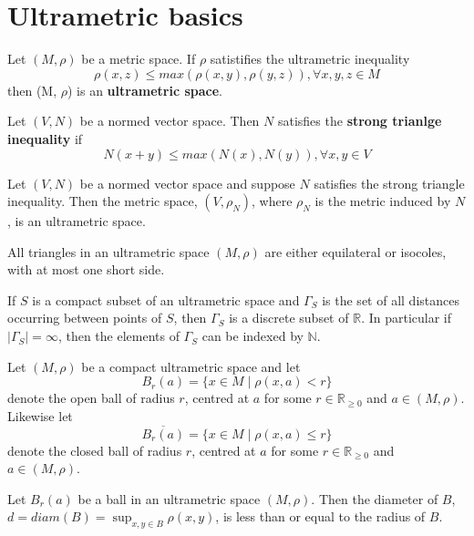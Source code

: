 \section{Ultrametric basics}


\begin{definition*}
	 Let $(M, \rho)$ be a metric space. If $\rho$ satistifies the ultrametric inequality
	\[\rho(x,z) \leq max{(\rho(x,y), \rho(y,z))}, \forall x,y,z \in M\] 
	then (M, $\rho$) is an \textbf{ultrametric space}.
\end{definition*}

\begin{definition*}
	 Let $(V, N)$ be a normed vector space. Then $N$ satisfies the \textbf{strong trianlge inequality} if
	\[N(x + y) \leq max(N(x), N(y)), \forall x,y \in V \]
\end{definition*}

\begin{proposition*}
	Let $(V,N)$ be a normed vector space and suppose $N$ satisfies the strong triangle inequality. Then the metric space, $(V,\rho_N)$, where $\rho_N$ is the metric induced by $N$, is an ultrametric space.
\end{proposition*}

\begin{proposition*}
	\cite{ar} All triangles in an ultrametric space $(M,\rho)$ are either equilateral or isocoles, with at most one short side. 
\end{proposition*}


\begin{proposition*}
\cite{ar} If $S$ is a compact subset of an ultrametric space and $\Gamma_S$ is the set of all distances occurring between points of $S$, then $\Gamma_S$ is a discrete subset of $\mathbb{R}$. In particular if $\mid \Gamma_S\mid = \infty$, then the elements of $\Gamma_S$ can be indexed by $\mathbb{N}$.
\end{proposition*}

\noindent Let $(M, \rho)$ be a compact ultrametric space and let \[B_r(a)=\{x \in M \mid \rho(x,a) < r\}\] denote the open ball of radius $r$, centred at $a$ for some $r \in \mathbb{R}_{\geq 0}$ and $a \in (M,\rho)$. Likewise let \[\overline{ B_r(a)}=\{x \in M \mid \rho(x,a) \leq r\}\]  denote the closed ball of radius $r$, centred at $a$ for some $r \in \mathbb{R}_{\geq 0}$ and $a \in (M,\rho)$.

\begin{proposition*}
	Let $B_r(a)$ be a ball in an ultrametric space $(M,\rho)$. Then the diameter of $B$, $d=diam(B)=\sup_{x,y \in B}{\rho(x,y)}$, is less than or equal to the radius of $B$.    
\end{proposition*}

